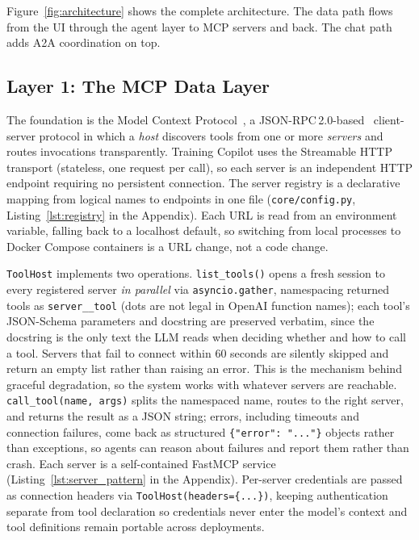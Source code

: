 Figure~\ref{fig:architecture} shows the complete architecture. The data path flows from the UI through the agent layer to MCP servers and back. The chat path adds A2A coordination on top.



\subsection{Layer 1: The MCP Data Layer}\label{sec:architecture:mcp}

The foundation is the Model Context Protocol~\citep{anthropic_mcp_2024}, a JSON-RPC\,2.0-based~\citep{jsonrpc_spec_2013} client-server protocol in which a \textit{host} discovers tools from one or more \textit{servers} and routes invocations transparently. Training Copilot uses the Streamable HTTP transport (stateless, one request per call), so each server is an independent HTTP endpoint requiring no persistent connection. The server registry is a declarative mapping from logical names to endpoints in one file (\texttt{core/config.py}, Listing~\ref{lst:registry} in the Appendix). Each URL is read from an environment variable, falling back to a localhost default, so switching from local processes to Docker Compose containers is a URL change, not a code change.

\texttt{ToolHost} implements two operations. \texttt{list\_tools()} opens a fresh session to every registered server \textit{in parallel} via \texttt{asyncio.gather}, namespacing returned tools as \texttt{server\_\_tool} (dots are not legal in OpenAI function names); each tool's JSON-Schema parameters and docstring are preserved verbatim, since the docstring is the only text the LLM reads when deciding whether and how to call a tool. Servers that fail to connect within 60 seconds are silently skipped and return an empty list rather than raising an error. This is the mechanism behind graceful degradation, so the system works with whatever servers are reachable. \texttt{call\_tool(name, args)} splits the namespaced name, routes to the right server, and returns the result as a JSON string; errors, including timeouts and connection failures, come back as structured \texttt{\{"error": "..."\}} objects rather than exceptions, so agents can reason about failures and report them rather than crash. Each server is a self-contained FastMCP service (Listing~\ref{lst:server_pattern} in the Appendix). Per-server credentials are passed as connection headers via \texttt{ToolHost(headers=\{...\})}, keeping authentication separate from tool declaration so credentials never enter the model's context and tool definitions remain portable across deployments.


